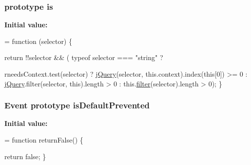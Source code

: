 \subsubsection[{\texorpdfstring{is}{is}}]{ {\bf prototype} is}\hypertarget{jquery-2_82_81-vsdoc_8js_ab09af0fb8923d70813f6d128591d1962}{}\label{jquery-2_82_81-vsdoc_8js_ab09af0fb8923d70813f6d128591d1962}
{\bfseries Initial value\+:}
\begin{DoxyCode}
= \textcolor{keyword}{function} (selector) \{
        

        \textcolor{keywordflow}{return} !!selector && (
            typeof selector === \textcolor{stringliteral}{"string"} ?
                
                
                rneedsContext.test(selector) ?
                    \hyperlink{jquery-2_82_81-vsdoc_8js_add5237586d970a38a81f990e8eb28c6c}{jQuery}(selector, this.context).index(\textcolor{keyword}{this}[0]) >= 0 :
                    \hyperlink{jquery-2_82_81-vsdoc_8js_add5237586d970a38a81f990e8eb28c6c}{jQuery}.filter(selector, \textcolor{keyword}{this}).length > 0 :
                this.\hyperlink{jquery-2_82_81-vsdoc_8js_ac99d0cf56cab46114f5765a14e03ad6d}{filter}(selector).length > 0);
    \}
\end{DoxyCode}
\subsubsection[{\texorpdfstring{is\+Default\+Prevented}{isDefaultPrevented}}]{ {\bf Event} {\bf prototype} is\+Default\+Prevented}\hypertarget{jquery-2_82_81-vsdoc_8js_af36c584d7af0deb379b8d6e3116775cc}{}\label{jquery-2_82_81-vsdoc_8js_af36c584d7af0deb379b8d6e3116775cc}
{\bfseries Initial value\+:}
\begin{DoxyCode}
= \textcolor{keyword}{function} returnFalse() \{
        

        \textcolor{keywordflow}{return} \textcolor{keyword}{false};
    \}
\end{DoxyCode}
